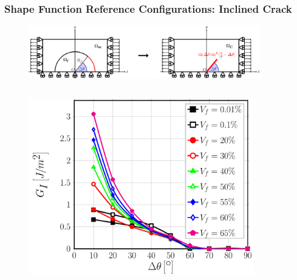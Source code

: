 \documentclass[first,firstsupp,lastsupp,last,hyperref,table]{ETHclass}
\begin{document}
\begin{frame}
\begin{columns}[c]
\begin{column}{0.5\textwidth}
\begin{figure}
\end{figure}
\end{column}
\end{columns}
\end{frame}

\begin{frame}
\frametitle{\vspace{0.4cm}\footnotesize Shape Function Reference Configurations: Inclined Crack}
\vspace{-1.25cm}
\centering
\begin{figure}
\includegraphics[width=0.9\textwidth]{RUCinclinedcrack.pdf}
\end{figure}
\vspace{-0.5cm}
\begin{columns}[c]
\begin{column}{0.5\textwidth}
\centering
\begin{figure}
\centering
\includegraphics[width=0.9\columnwidth]{GI-free-inclinedcrack.pdf}
\end{figure}
\end{column}
\begin{column}{0.5\textwidth}
\centering
\begin{figure}
\centering

\end{figure}
\end{column}
\end{columns}
\end{frame}
\end{document}
